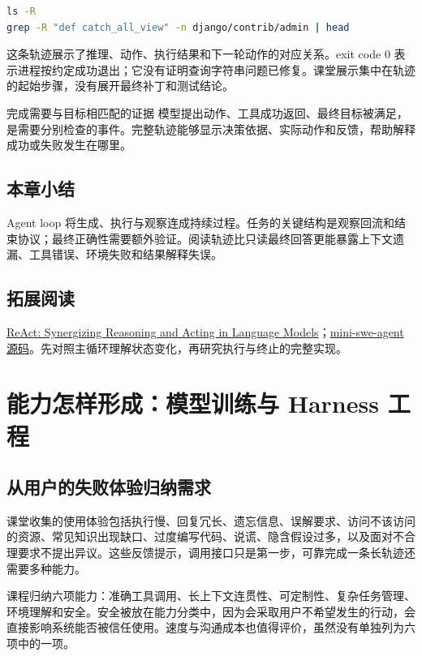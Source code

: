 \documentclass[11pt,a4paper]{article}
\begin{document}
\begin{lstlisting}[caption={轨迹中实际出现的两个 Bash 命令},language=bash]
ls -R
grep -R "def catch_all_view" -n django/contrib/admin | head
\end{lstlisting}

这条轨迹展示了推理、动作、执行结果和下一轮动作的对应关系。exit code 0 表示进程按约定成功退出；它没有证明查询字符串问题已修复。课堂展示集中在轨迹的起始步骤，没有展开最终补丁和测试结论。

\begin{importantbox}{完成需要与目标相匹配的证据}
模型提出动作、工具成功返回、最终目标被满足，是需要分别检查的事件。完整轨迹能够显示决策依据、实际动作和反馈，帮助解释成功或失败发生在哪里。
\end{importantbox}

\subsection{本章小结}
Agent loop 将生成、执行与观察连成持续过程。任务的关键结构是观察回流和结束协议；最终正确性需要额外验证。阅读轨迹比只读最终回答更能暴露上下文遗漏、工具错误、环境失败和结果解释失误。

\subsection{拓展阅读}
\href{https://arxiv.org/abs/2210.03629}{ReAct: Synergizing Reasoning and Acting in Language Models}；\href{https://github.com/SWE-agent/mini-swe-agent}{mini-swe-agent 源码}。先对照主循环理解状态变化，再研究执行与终止的完整实现。

\clearpage
\section{能力怎样形成：模型训练与 Harness 工程}
\subsection{从用户的失败体验归纳需求}
课堂收集的使用体验包括执行慢、回复冗长、遗忘信息、误解要求、访问不该访问的资源、常见知识出现缺口、过度编写代码、说谎、隐含假设过多，以及面对不合理要求不提出异议。这些反馈提示，调用接口只是第一步，可靠完成一条长轨迹还需要多种能力。

课程归纳六项能力：准确工具调用、长上下文连贯性、可定制性、复杂任务管理、环境理解和安全。安全被放在能力分类中，因为会采取用户不希望发生的行动，会直接影响系统能否被信任使用。速度与沟通成本也值得评价，虽然没有单独列为六项中的一项。
\end{document}
